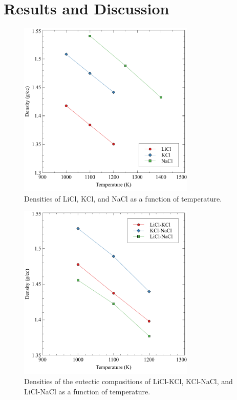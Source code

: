\documentclass[review]{elsarticle}
\begin{document}
\FloatBarrier

\section{Results and Discussion}


\begin{figure}[htbp]
\begin{center}
\includegraphics[width=0.75\textwidth]{./images/endpoints.pdf}
\caption{Densities of LiCl, KCl, and NaCl as a function of temperature.}
\label{default}
\end{center}
\end{figure}

\begin{figure}[htbp]
\begin{center}
\includegraphics[width=0.75\textwidth]{./images/binaries.pdf}
\caption{Densities of the eutectic compositions of LiCl-KCl, KCl-NaCl, and LiCl-NaCl as a function of temperature.}
\label{default}
\end{center}
\end{figure}
\end{document}
